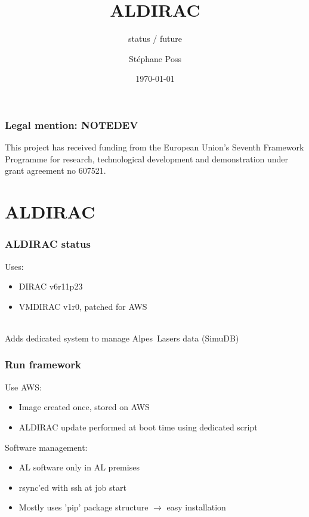 \documentclass[14pt]{beamer}
\title{ALDIRAC}
\subtitle{status / future}
\author{St\'ephane Poss}
\date{\today}
\begin{document}
\begin{frame}[plain]
\titlepage
\end{frame}

\begin{frame}
\tableofcontents
\end{frame}

\begin{frame}
\frametitle{Legal mention: NOTEDEV}
This project has received funding from the European Union's Seventh Framework Programme for research, technological development and demonstration under grant agreement no 607521.
\end{frame}

\section{ALDIRAC}
\begin{frame}
\frametitle{ALDIRAC status}
Uses:
\begin{itemize}
\item DIRAC v6r11p23
\pause
\item VMDIRAC v1r0, patched for AWS
\end{itemize}
~\\
\pause
Adds dedicated system to manage Alpes~Lasers data (SimuDB)
\end{frame}

\begin{frame}
\frametitle{Run framework}
Use AWS:
\begin{itemize}
\item Image created once, stored on AWS
\item ALDIRAC update performed at boot time using dedicated script
\end{itemize}
Software management:
\begin{itemize}
\item AL software only in AL premises
\item rsync'ed with ssh at job start
\item Mostly uses 'pip' package structure $\rightarrow$ easy installation
\end{itemize}
\end{frame}
\end{document}
